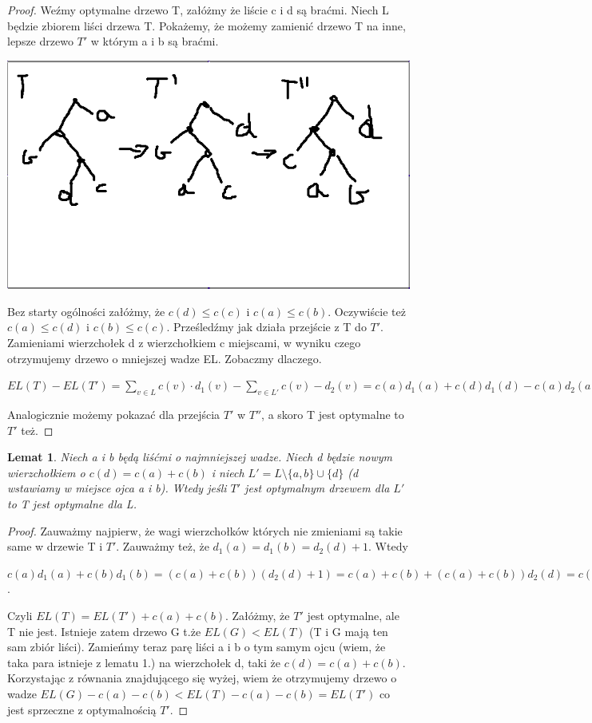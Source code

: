 \documentclass[a4paper]{scrartcl}
\newtheorem{lemma}{Lemat}
\begin{document}
\begin{proof}
Weźmy optymalne drzewo T, załóżmy że liście c i d są braćmi. Niech L będzie zbiorem liści drzewa T. Pokażemy, że możemy zamienić drzewo T na inne, lepsze drzewo $T'$ w którym a i b są braćmi. 
\begin{center}
	\includegraphics[scale=0.2]{przejscia.png}
\end{center}
Bez starty ogólności załóżmy, że $c(d) \leq c(c)$ i $c(a) \leq c(b)$. Oczywiście też $c(a) \leq c(d)$ i $c(b) \leq c(c)$. Prześledźmy jak działa przejście z T do $T'$. Zamieniami wierzchołek d z wierzchołkiem c miejscami, w wyniku czego otrzymujemy drzewo o mniejszej wadze EL. Zobaczmy dlaczego.
\begin{center}
$EL(T) - EL(T') = \sum_{v \in L} c(v)\cdot d_1(v) - \sum_{v \in L'}c(v) - d_2(v) = c(a)d_1(a) + c(d)d_1(d) - c(a)d_2(a) - c(d)d_2(d) = c(a)d_1(a) + c(d)d_1(d) - c(a)d_1(d) - c(d)d_1(a) = (c(d) - c(a))(d_1(d) - d_1(a)) \geq 0$
\end{center}
Analogicznie możemy pokazać dla przejścia $T'$ w $T''$, a skoro T jest optymalne to $T'$ też.
\end{proof}
\begin{lemma}
Niech a i b będą liśćmi o najmniejszej wadze. Niech d będzie nowym wierzchołkiem o $c(d) = c(a) + c(b)$ i niech $L' = L \setminus \{a, b\} \cup \{d\}$ (d wstawiamy w miejsce ojca a i b). Wtedy jeśli $T'$ jest optymalnym drzewem dla $L'$ to T jest optymalne dla L.
\end{lemma}
\begin{proof}
Zauważmy najpierw, że wagi wierzchołków których nie zmieniami są takie same w drzewie T i $T'$. Zauważmy też, że $d_1(a) = d_1(b) = d_2(d)+1$. Wtedy
\begin{center}
$c(a)d_1(a) + c(b)d_1(b) = (c(a) + c(b))(d_2(d) + 1) = c(a) + c(b) + (c(a) + c(b))d_2(d) = c(a) + c(b) + c(d)d_2(d)$.
\end{center}
Czyli $EL(T) = EL(T') + c(a) + c(b)$. Załóżmy, że $T'$ jest optymalne, ale T nie jest. Istnieje zatem drzewo G t.że $EL(G) < EL(T)$ (T i G mają ten sam zbiór liści). Zamieńmy teraz parę liści a i b o tym samym ojcu (wiem, że taka para istnieje z lematu 1.) na wierzchołek d, taki że $c(d) = c(a) + c(b)$. Korzystając z równania znajdującego się wyżej, wiem że otrzymujemy drzewo o wadze $EL(G) - c(a) - c(b) < EL(T) - c(a) - c(b) = EL(T')$ co jest sprzeczne z optymalnością $T'$.
\end{proof}
\end{document}

